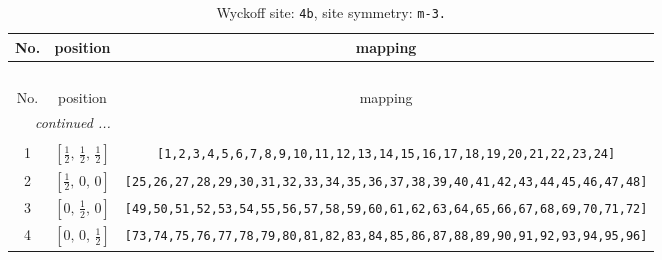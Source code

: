 \documentclass[fleqn,8pt]{jsarticle}
\begin{document}
\begin{longtable}{ccc}
\caption{Wyckoff site: {\tt 4b}, site symmetry: {\tt m-3.}}
 \\
 \hline \hline
No. & position & mapping \\ \hline \endfirsthead

\multicolumn{2}{l}{\tablename\ \thetable{}} \\
 \hline \hline
No. & position & mapping \\ \hline \endhead

 \hline \hline
\multicolumn{2}{r}{\footnotesize\it continued ...} \\ \endfoot

 \hline \hline
\multicolumn{2}{r}{} \\ \endlastfoot

1 & $\left[ \frac{1}{2},\, \frac{1}{2},\, \frac{1}{2} \right]$ & {\tt [1,2,3,4,5,6,7,8,9,10,11,12,13,14,15,16,17,18,19,20,21,22,23,24]} \\ \hline
2 & $\left[ \frac{1}{2},\, 0,\, 0 \right]$ & {\tt [25,26,27,28,29,30,31,32,33,34,35,36,37,38,39,40,41,42,43,44,45,46,47,48]} \\ \hline
3 & $\left[ 0,\, \frac{1}{2},\, 0 \right]$ & {\tt [49,50,51,52,53,54,55,56,57,58,59,60,61,62,63,64,65,66,67,68,69,70,71,72]} \\ \hline
4 & $\left[ 0,\, 0,\, \frac{1}{2} \right]$ & {\tt [73,74,75,76,77,78,79,80,81,82,83,84,85,86,87,88,89,90,91,92,93,94,95,96]} \\
\end{longtable}
\renewcommand{\arraystretch}{1.2}
\end{document}
